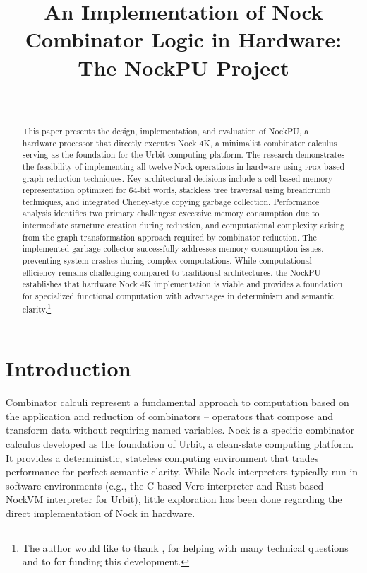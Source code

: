 \documentclass[twoside]{article}
\title{An Implementation of Nock Combinator Logic in Hardware: The NockPU Project}
\author{\authorpatp \\ \affiliation}
\date{}
\begin{document}
\maketitle
\thispagestyle{firststyle}

\begin{abstract}
\sloppy
This paper presents the design, implementation, and evaluation of NockPU, a hardware processor that directly executes Nock 4K, a minimalist combinator calculus serving as the foundation for the Urbit computing platform. The research demonstrates the feasibility of implementing all twelve Nock operations in hardware using \textsc{fpga}-based graph reduction techniques. Key architectural decisions include a cell-based memory representation optimized for 64-bit words, stackless tree traversal using breadcrumb techniques, and integrated Cheney-style copying garbage collection. Performance analysis identifies two primary challenges: excessive memory consumption due to intermediate structure creation during reduction, and computational complexity arising from the graph transformation approach required by combinator reduction. The implemented garbage collector successfully addresses memory consumption issues, preventing system crashes during complex computations. While computational efficiency remains challenging compared to traditional architectures, the NockPU establishes that hardware Nock 4K implementation is viable and provides a foundation for specialized functional computation with advantages in determinism and semantic clarity.\footnote{The author would like to thank {}, {} for helping with many technical questions and to {} for funding this development.}
\end{abstract}

\setcounter{page}{99}

\tableofcontents

\section{Introduction}

Combinator calculi represent a fundamental approach to computation based on the application and reduction of combinators -- operators that compose and transform data without requiring named variables. Nock is a specific combinator calculus developed as the foundation of Urbit, a clean-slate computing platform. It provides a deterministic, stateless computing environment that trades performance for perfect semantic clarity. While Nock interpreters typically run in software environments (e.g., the C-based Vere interpreter and Rust-based NockVM interpreter for Urbit), little exploration has been done regarding the direct implementation of Nock in hardware.
\end{document}
